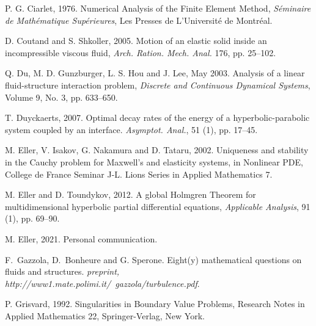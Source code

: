 \documentclass[11pt]{article}
\begin{document}
\begin{thebibliography}{99}
 P. G. Ciarlet, 1976. Numerical Analysis of the Finite
Element Method, \textit{S\'{e}minaire de Math\'{e}matique Sup\'{e}rieures},
Les Presses de L'Universit\'{e} de Montr\'{e}al.

 D. Coutand and S. Shkoller, 2005. Motion of an elastic solid
inside an incompressible viscous fluid, \textit{Arch. Ration. Mech. Anal.} 176, pp. 25--102.

 Q. Du, M. D. Gunzburger, L. S. Hou and J. Lee,  May 2003. Analysis of a
linear fluid-structure interaction problem, \textit{Discrete and Continuous
Dynamical Systems}, Volume 9, No. 3, pp. 633--650.


 T. Duyckaerts, 2007. Optimal decay rates of the
energy of a hyperbolic-parabolic system  coupled by an interface. 
{\em Asymptot. Anal.}, 51 (1), pp. 17--45.

 M. Eller, V. Isakov, G. Nakamura and D. Tataru, 2002. Uniqueness and stability in the Cauchy problem for Maxwell's and elasticity systems, in Nonlinear PDE, College de France Seminar J-L. Lions Series in Applied Mathematics 7.

 M. Eller and D. Toundykov, 2012. A global Holmgren Theorem for multidimensional hyperbolic partial differential equations,  {\em Applicable Analysis}, 91 (1), pp. 69--90.

 M. Eller, 2021. Personal communication.



 F.~Gazzola, D.~Bonheure and G.
Sperone.  Eight(y) mathematical questions on fluids and structures. %
 {\em preprint, http://www1.mate.polimi.it/~gazzola/turbulence.pdf}.


 P. Grisvard, 1992. Singularities in Boundary Value
Problems, Research Notes in Applied Mathematics 22, Springer-Verlag, New
York.


\end{thebibliography}
\end{document}
